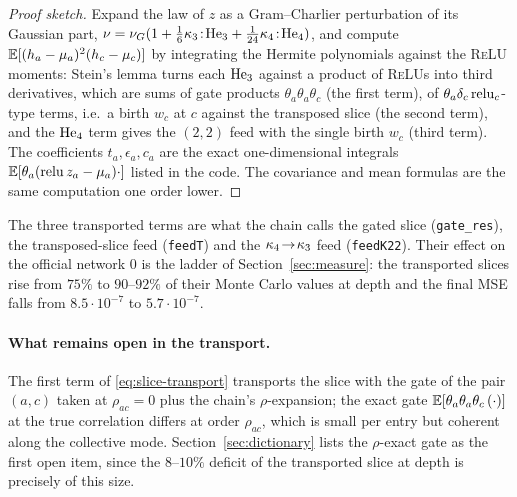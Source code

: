 \begin{proof}[Proof sketch]
Expand the law of $z$ as a Gram--Charlier perturbation of its Gaussian part, $\nu=\nu_G(1+\tfrac16\kappa_3\!:\!\mathrm{He}_3
+\tfrac1{24}\kappa_4\!:\!\mathrm{He}_4)$, and compute $\mathbb E[(h_a-\mu_a)^2(h_c-\mu_c)]$ by integrating the Hermite
polynomials against the \textsc{ReLU} moments: Stein's lemma turns each $\mathrm{He}_3$ against a product of
\textsc{ReLU}s into third derivatives, which are sums of gate products $\theta_a\theta_a\theta_c$ (the first term),
of $\theta_a\delta_c\operatorname{relu}_c$-type terms, i.e.\ a birth $w_c$ at $c$ against the transposed slice (the second term),
and the $\mathrm{He}_4$ term gives the $(2,2)$ feed with the single birth $w_c$ (third term). The coefficients
$t_a,\epsilon_a,c_a$ are the exact one-dimensional integrals $\mathbb E[\theta_a(\operatorname{relu} z_a-\mu_a)\cdot]$ listed in the code.
The covariance and mean formulas are the same computation one order lower.
\end{proof}

The three transported terms are what the chain calls the gated slice (\texttt{gate\_res}), the transposed-slice
feed (\texttt{feedT}) and the $\kappa_4\!\to\!\kappa_3$ feed (\texttt{feedK22}). Their effect on the official
network $0$ is the ladder of Section~\ref{sec:measure}: the transported slices rise from $75\%$ to $90$--$92\%$ of
their Monte Carlo values at depth and the final MSE falls from $8.5\cdot10^{-7}$ to $5.7\cdot10^{-7}$.

\paragraph{What remains open in the transport.} The first term of \eqref{eq:slice-transport} transports the slice
with the gate of the pair $(a,c)$ taken at $\rho_{ac}=0$ plus the chain's $\rho$-expansion; the exact gate
$\mathbb E[\theta_a\theta_a\theta_c\,(\cdot)]$ at the true correlation differs at order $\rho_{ac}$, which is small per entry
but coherent along the collective mode. Section~\ref{sec:dictionary} lists the $\rho$-exact gate as the first
open item, since the $8$--$10\%$ deficit of the transported slice at depth is precisely of this size.


